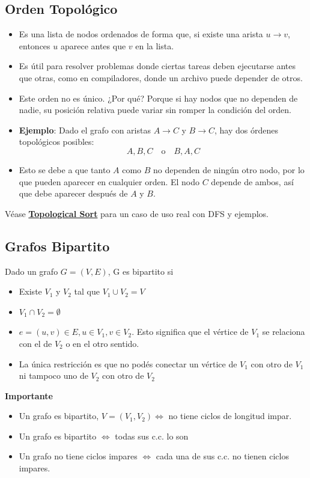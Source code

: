 \documentclass[10pt,a4paper]{article}
\begin{document}
\subsection*{Orden Topológico}
\begin{itemize}
    \item Es una lista de nodos ordenados de forma que, si existe una arista $u \rightarrow v$, entonces $u$ aparece antes que $v$ en la lista.
    \item Es útil para resolver problemas donde ciertas tareas deben ejecutarse antes que otras, como en compiladores, donde un archivo puede depender de otros.
    \item Este orden no es único. ¿Por qué? Porque si hay nodos que no dependen de nadie, su posición relativa puede variar sin romper la condición del orden.
    \item \textbf{Ejemplo}: Dado el grafo con aristas $A \rightarrow C$ y $B \rightarrow C$, hay dos órdenes topológicos posibles: 
    \[
    A, B, C \quad \text{o} \quad B, A, C
    \]
    \item Esto se debe a que tanto $A$ como $B$ no dependen de ningún otro nodo, por lo que pueden aparecer en cualquier orden. El nodo $C$ depende de ambos, así que debe aparecer después de $A$ y $B$.
\end{itemize}
Véase \hyperref[subsubsec:topological_sort]{\textbf{Topological Sort}} para un caso de uso real con DFS y ejemplos. 
\subsection*{Grafos Bipartito}
Dado un grafo $G = (V, E)$, G es bipartito si
\begin{itemize}
    \item Existe $V_{1}$ y $V_{2}$ tal que $V_{1} \cup V_{2} = V$
    \item $V_{1} \cap V_{2} = \emptyset$
    \item $e = (u,v) \in E, u \in V_{1}, v \in V_{2}$. Esto significa que el vértice de $V_{1}$ se relaciona con el de $V_{2}$ o en el otro sentido. 
    \item La única restricción es que no podés conectar un vértice de $V_{1}$ con otro de $V_{1}$ ni tampoco uno de $V_{2}$ con otro de $V_{2}$
\end{itemize}
\textbf{Importante}
\begin{itemize}
    \item Un grafo es bipartito, $V = (V_{1}, V_{2}) \iff$ no tiene ciclos de longitud impar.
    \item Un grafo es bipartito $\iff$ todas sus c.c. lo son 
    \item Un grafo no tiene ciclos impares $\iff$ cada una de sus c.c. no tienen ciclos impares.
\end{itemize}
\end{document}
